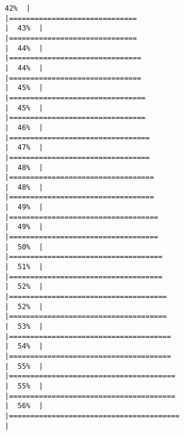 \documentclass[
]{book}
\begin{document}
\begin{verbatim}
42%  |                                                                              |==============================                                        |  43%  |                                                                              |==============================                                        |  44%  |                                                                              |===============================                                       |  44%  |                                                                              |===============================                                       |  45%  |                                                                              |================================                                      |  45%  |                                                                              |================================                                      |  46%  |                                                                              |=================================                                     |  47%  |                                                                              |=================================                                     |  48%  |                                                                              |==================================                                    |  48%  |                                                                              |==================================                                    |  49%  |                                                                              |===================================                                   |  49%  |                                                                              |===================================                                   |  50%  |                                                                              |====================================                                  |  51%  |                                                                              |====================================                                  |  52%  |                                                                              |=====================================                                 |  52%  |                                                                              |=====================================                                 |  53%  |                                                                              |======================================                                |  54%  |                                                                              |======================================                                |  55%  |                                                                              |=======================================                               |  55%  |                                                                              |=======================================                               |  56%  |                                                                              |========================================                              |  
\end{verbatim}
\end{document}
